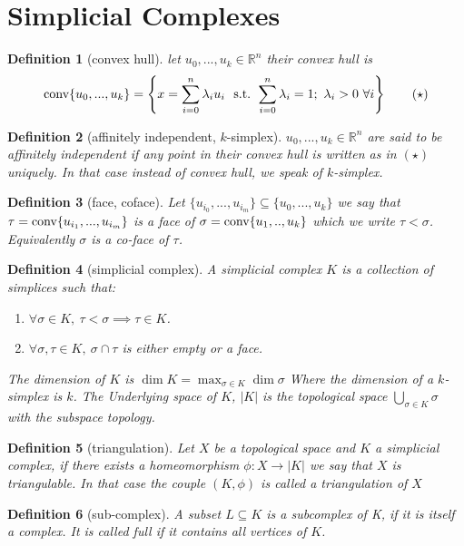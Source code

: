\documentclass{article}
\newcommand{\R}{\mathbb{R}}
\newcommand{\conv}{\textmd{conv}}
\newcommand{\st}{\textmd{ s.t. }}
\newtheorem{definition}{Definition}[section]
\begin{document}
	\section{Simplicial Complexes}
	\begin{definition}[convex hull]
	let $ u_0,...,u_k \in \R^n $ their convex hull is
	 \[ \conv \{u_0,...,u_k\} = \left\{ x= \sum_{i=0}^{n} \lambda_i u_i \ \st    \sum_{i=0}^{n} \lambda_i = 1; \ \lambda_i > 0 \ \forall i \right\} \qquad (\star) \]
	\end{definition}
	\begin{definition}[affinitely independent, $k$-simplex]
		$u_0,...,u_k \in \R^n$ are said to be affinitely independent if any point in their convex hull is written as in $(\star)$ uniquely.
		In that case instead of convex hull, we speak of $k$-simplex.
	\end{definition}
	\begin{definition} [face, coface]
		Let $ \{u_{i_0},...,u_{i_m} \} \subseteq \{u_0,...,u_k\} $ we say that $ \tau = \conv\{u_{i_1},...,u_{i_m}\} $ is a face of $ \sigma = \conv\{u_1,..,u_k\} $ which we write $ \tau < \sigma $. Equivalently $ \sigma $ is a co-face of $ \tau $.
	\end{definition}
	\begin{definition}[simplicial complex]
		A simplicial complex $K$ is a collection of simplices such that:
		\begin{enumerate}[label=(S\arabic*)]
			\item $ \forall \sigma \in K, \ \tau < \sigma \implies \tau \in K $. 
			\item $ \forall \sigma,\tau \in K, \ \sigma \cap \tau $ is either empty or a face.
		\end{enumerate}
	The dimension of $K$ is $ \dim K = \max_{\sigma \in K} \dim \sigma $ Where the dimension of a $k$-simplex is $k$.
	The Underlying space of $K$, $|K|$ is the topological space $ \bigcup_{\sigma \in K} \sigma $ with the subspace topology.
	\end{definition}
\begin{definition}[triangulation]
	Let $X$ be a topological space and $K$ a simplicial complex, if there exists a homeomorphism $ \phi : X \to |K| $ we say that $X$ is triangulable. In that case the couple $ (K,\phi) $ is called a triangulation of $X$
\end{definition}
	\begin{definition}[sub-complex]
		A subset $L \subseteq K$ is a subcomplex of K, if it is itself a complex. It is called full if it contains all vertices of $K$.
	\end{definition}
\end{document}
